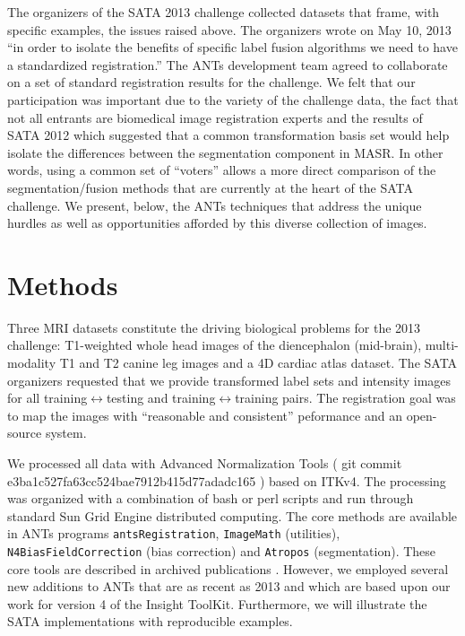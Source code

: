 \documentclass{llncs}
\begin{document}
The organizers of the SATA 2013 challenge collected datasets that
frame, with specific examples, the issues raised above.  The
organizers wrote on May 10, 2013 ``in order to isolate the benefits of
specific label fusion algorithms we need to have a standardized
registration.''  The ANTs development team agreed to collaborate on a set of standard registration results for the challenge.  We
felt that our participation was important due to the variety of the challenge
data, the fact that not all entrants are biomedical image registration
experts and the results of SATA 2012 which suggested that a common
transformation basis set would help isolate the differences between
the segmentation component in MASR.  In other words, using a common
set of ``voters'' allows a more direct comparison of the
segmentation/fusion methods that are currently at the heart of the
SATA challenge. We present,
below, the ANTs techniques that address the unique hurdles as well as
opportunities afforded by this diverse collection of images.

\section{Methods} 
Three MRI datasets constitute the driving biological problems for the
2013 challenge: T1-weighted whole head images of the diencephalon
(mid-brain), multi-modality T1 and T2 canine leg images and a 4D
cardiac atlas dataset.  The SATA organizers requested that we provide
transformed label sets and intensity images for all
training$\leftrightarrow$testing and training$\leftrightarrow$training
pairs.  The registration goal was to map the images with ``reasonable
and consistent'' peformance and an open-source system.  

We processed all data with Advanced Normalization Tools ( git
commit e3ba1c527fa63cc524bae7912b415d77adadc165 ) based on ITKv4.  The
processing was organized with a combination of bash or perl scripts
and run through standard Sun Grid Engine distributed computing.
The core methods are available in ANTs programs
\texttt{antsRegistration}, \texttt{ImageMath} (utilities),
\texttt{N4BiasFieldCorrection} (bias correction) and \texttt{Atropos}
(segmentation).  These core tools are described in archived
publications \cite{}.  However, we employed several new additions to
ANTs that are as recent as 2013 and which are based upon our work for
version 4 of the Insight ToolKit.  Furthermore, we will illustrate the
SATA implementations with reproducible examples.
\end{document}
